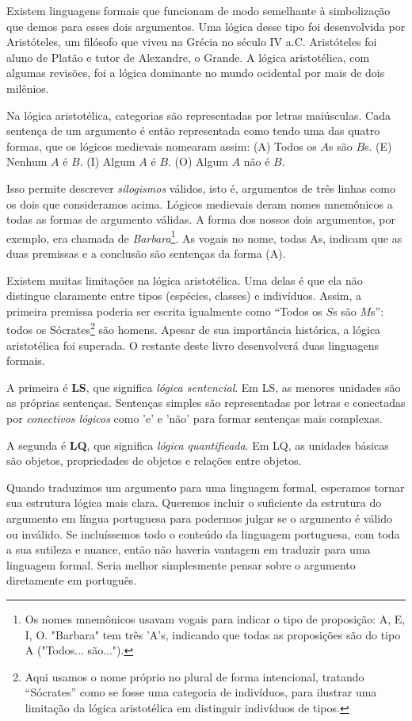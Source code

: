 Existem linguagens formais que funcionam de modo semelhante à simbolização que demos para esses dois argumentos. Uma lógica desse tipo foi desenvolvida por Aristóteles, um filósofo que viveu na Grécia no século IV a.C. Aristóteles foi aluno de Platão e tutor de Alexandre, o Grande. A lógica aristotélica, com algumas revisões, foi a lógica dominante no mundo ocidental por mais de dois milênios.

Na lógica aristotélica, categorias são representadas por letras maiúsculas. Cada sentença de um argumento é então representada como tendo uma das quatro formas, que os lógicos medievais nomearam assim: (A) Todos os $A$s são $B$s. (E) Nenhum $A$ é $B$. (I) Algum $A$ é $B$. (O) Algum $A$ não é $B$.

Isso permite descrever \emph{silogismos} válidos, isto é, argumentos de três linhas como os dois que consideramos acima. Lógicos medievais deram nomes mnemônicos a todas as formas de argumento válidas. A forma dos nossos dois argumentos, por exemplo, era chamada de \emph{Barbara}\footnote{Os nomes mnemônicos usavam vogais para indicar o tipo de proposição: A, E, I, O. "Barbara" tem três 'A's, indicando que todas as proposições são do tipo A ("Todos... são...").}. As vogais no nome, todas As, indicam que as duas premissas e a conclusão são sentenças da forma (A).

Existem muitas limitações na lógica aristotélica. Uma delas é que ela não distingue claramente entre tipos (espécies, classes) e indivíduos. Assim, a primeira premissa poderia ser escrita igualmente como ``Todos os $S$s são $M$s'': todos os Sócrates\footnote{Aqui usamos o nome próprio no plural de forma intencional, tratando “Sócrates” como se fosse uma categoria de indivíduos, para ilustrar uma limitação da lógica aristotélica em distinguir indivíduos de tipos.} são homens. Apesar de sua importância histórica, a lógica aristotélica foi superada. O restante deste livro desenvolverá duas linguagens formais.

A primeira é \textbf{LS}, que significa \emph{lógica sentencial}. Em LS, as menores unidades são as próprias sentenças. Sentenças simples são representadas por letras e conectadas por \emph{conectivos lógicos} como 'e' e 'não' para formar sentenças mais complexas.

A segunda é \textbf{LQ}, que significa \emph{lógica quantificada}. Em LQ, as unidades básicas são objetos, propriedades de objetos e relações entre objetos.

Quando traduzimos um argumento para uma linguagem formal, esperamos tornar sua estrutura lógica mais clara. Queremos incluir o suficiente da estrutura do argumento em língua portuguesa para podermos julgar se o argumento é válido ou inválido. Se incluíssemos todo o conteúdo da linguagem portuguesa, com toda a sua sutileza e nuance, então não haveria vantagem em traduzir para uma linguagem formal. Seria melhor simplesmente pensar sobre o argumento diretamente em português.

